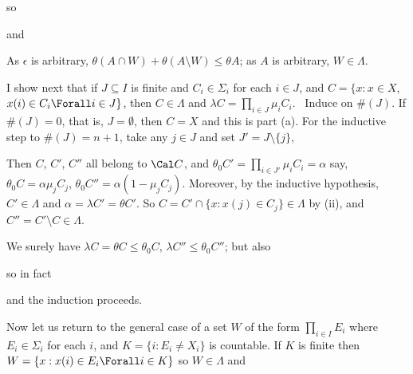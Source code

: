{\noindent so


\noindent and

\noindent As $\epsilon$ is arbitrary, $\theta(A\cap W)+\theta(A\setminus
W)\le\theta A$;  as $A$ is arbitrary, $W\in\Lambda$.

\medskip

I show next that if $J\subseteq I$ is finite and $C_i\in\Sigma_i$ for
each $i\in J$, and $C=\{x:x\in X$, $x(i)\in C_i\Forall i\in J\}$,
then $C\in\Lambda$ and  $\lambda C=\prod_{i\in J}\mu_iC_i$.   \Prf\
Induce on $\#(J)$.   If $\#(J)=0$, that is, $J=\emptyset$, then $C=X$
and this is part (a).   For the inductive step to $\#(J)=n+1$, take any
$j\in J$ and set $J'=J\setminus\{j\}$,


\Centerline{$C''=C'\setminus C=\{x:x\in C'$, $x(j)\in X_j\setminus
C_j\}.$}

\noindent Then $C$, $C'$, $C''$ all belong to $\Cal C$, and $\theta_0
C'=\prod_{i\in J'}\mu_iC_i=\alpha$ say, $\theta_0 C=\alpha\mu_jC_j$,
$\theta_0 C''=\alpha(1-\mu_jC_j)$.   Moreover, by the inductive
hypothesis, $C'\in\Lambda$ and $\alpha=\lambda C'=\theta C'$.   So
$C=C'\cap\{x:x(j)\in C_j\}\in\Lambda$ by (ii), and $C''=C'\setminus
C\in\Lambda$.

We surely have $\lambda C=\theta C\le\theta_0 C$, $\lambda
C''\le\theta_0 C''$;   but also


\noindent so in fact


\noindent and the induction proceeds.\ \Qed

\medskip

 Now let us return to the general case of a set $W$ of
the form $\prod_{i\in I}E_i$ where $E_i\in\Sigma_i$ for each $i$, and
$K=\{i:E_i\ne X_i\}$ is countable.   If $K$ is finite then
$W=\{x:x(i)\in E_i\Forall i\in K\}$ so $W\in\Lambda$ and

}
